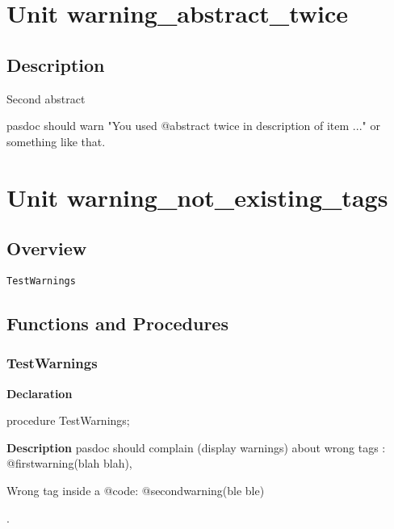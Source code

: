 \documentclass{report}
\begin{document}
\chapter{Unit warning{\_}abstract{\_}twice}
\section{Description}
Second abstract\hfill\vspace*{1ex}





pasdoc should warn "You used @abstract twice in description of item ..." or something like that.
\chapter{Unit warning{\_}not{\_}existing{\_}tags}
\section{Overview}
\begin{description}
\item[\texttt{TestWarnings}]
\end{description}
\section{Functions and Procedures}
\subsection*{TestWarnings}
\begin{list}{}{
\setlength{\itemindent}{0cm}
\setlength{\listparindent}{0cm}
\setlength{\leftmargin}{\evensidemargin}
\addtolength{\leftmargin}{\tmplength}
\settowidth{\labelsep}{X}
\addtolength{\leftmargin}{\labelsep}
\setlength{\labelwidth}{\tmplength}
}
\begin{flushleft}
\item[\textbf{Declaration}\hfill]
\begin{ttfamily}
procedure TestWarnings;\end{ttfamily}


\end{flushleft}
\par
\item[\textbf{Description}]
pasdoc should complain (display warnings) about wrong tags : @firstwarning(blah blah), \begin{ttfamily}Wrong tag inside a @code: @secondwarning(ble ble)\end{ttfamily}.

\end{list}
\end{document}
